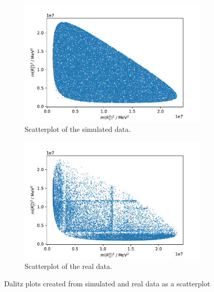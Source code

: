 \begin{figure}[H]
  \centering
  \begin{subfigure}{0.49\textwidth}
    \includegraphics[width=\textwidth]{plots/Dalitz_sim_scatter.pdf}
    \caption{Scatterplot of the simulated data.}
    \label{fig:ProbPi}
  \end{subfigure}
  \begin{subfigure}{0.49\textwidth}
    \includegraphics[width=\textwidth]{plots/Dalitz_scatter.pdf}
    \caption{Scatterplot of the real data.}
    \label{fig:ProbPi}
  \end{subfigure}
  \caption{Dalitz plots created from simulated and real data as a scatterplot}
  \label{f5}
\end{figure}


